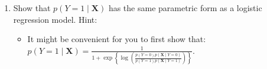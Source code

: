 \documentclass[11pt]{article}
\renewcommand{\vec}[1]{\mathbf{#1}}
\begin{document}
\begin{enumerate}
\item Show that $p(Y = 1 \mid \vec{X})$ has the same parametric form as a logistic regression model.
Hint:
\begin{itemize}
\item It might be convenient for you to first show that:
$p(Y = 1 \mid \vec{X}) = \frac{1}{1 + \exp\left\{ \log \left( \frac{ p(Y=0) p(\vec{X} \mid Y=0) }{ p(Y=1) p(\vec{X} \mid Y=1) } \right) \right\}}$.
\end{itemize}

\begin{answertext}{10cm}{}
\end{answertext}
\end{enumerate}
\end{document}
